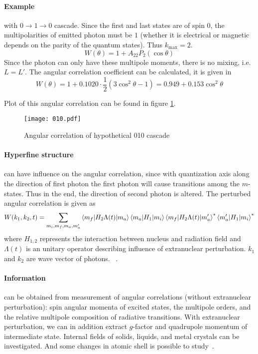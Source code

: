 \paragraph{Example} with $0 \rightarrow 1 \rightarrow 0$ \gag cascade. Since the first and last states are of spin $0$, the multipolarities of emitted photon must be $1$ (whether it is electrical or magnetic depends on the parity of the quantum states). Thus $k_\text{max} = 2$.
\begin{equation}
   W(\theta) = 1 + A_{22} P_2(\cos \theta)
   \label{math:W010}
\end{equation}
Since the photon can only have these multipole moments, there is no mixing, i.e.~$L=L'$. The angular correlation coefficient can be calculated, it is given in~\cite{siegbahn}
\begin{equation}
   W(\theta) = 1 + 0.1020 \cdot \frac{1}{2} \left( 3 \cos^2 \theta - 1 \right) = 0.949 + 0.153 \cos^2 \theta
\end{equation}

Plot of this angular correlation can be found in figure \ref{W010}.
\begin{figure}[ht]
   \centering
   \texttt{[image: 010.pdf]}
   \caption{Angular correlation of hypothetical 010 cascade}%
   \label{W010}
\end{figure}

\paragraph{Hyperfine structure} can have influence on the angular correlation, since with quantization axis along the direction of first photon the first photon will cause transitions among the $m$-states. Thus in the end, the direction of second photon is altered. The perturbed angular correlation is given as
\begin{equation}
   W(k_1, k_2, t) = \sum_{m_i, m_f, m_a, m'_a} \braket{m_f | H_2 \Lambda(t) | m_a} \braket{m_a | H_1 | m_i} \braket{m_f | H_2 \Lambda(t) | m'_a}^* \braket{m'_a | H_1 | m_i}^*
\end{equation}
where $H_{1,2}$ represents the interaction between nucleus and radiation field and $\Lambda(t)$ is an unitary operator describing influence of extranuclear perturbation. $k_1$ and $k_2$ are wave vector of photons.
~\cite{siegbahn}.


\paragraph{Information} can be obtained from measurement of \gag angular correlations (without extranuclear perturbation): spin angular momenta of excited states, the multipole orders, and the relative multipole composition of radiative transitions\cite{RAWilson}. With extranuclear perturbation, we can in addition extract $g$-factor and quadrupole momentum of intermediate state. Internal fields of solids, liquids, and metal crystals can be investigated. And some changes in atomic shell is possible to study~\cite{siegbahn}.



